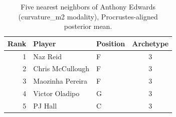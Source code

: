 \begin{table}[htbp]
  \centering\small
  \begin{tabular}{rllc}
    \toprule
    Rank & Player & Position & Archetype \\
    \midrule
    1 & Naz Reid & F & 3 \\
    2 & Chris McCullough & F & 3 \\
    3 & Maozinha Pereira & F & 3 \\
    4 & Victor Oladipo & G & 3 \\
    5 & PJ Hall & C & 3 \\
    \bottomrule
  \end{tabular}
  \caption{Five nearest neighbors of Anthony Edwards (curvature_m2 modality), Procrustes-aligned posterior mean.}
  \label{tab:Anthony_Edwards_neighbors_curvature_m2}
\end{table}

